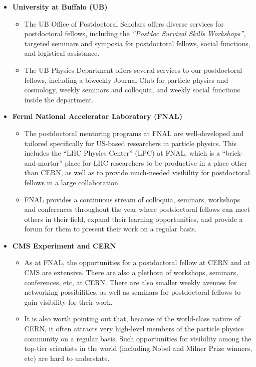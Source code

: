 \documentclass[12pt]{proposalnsf}
\begin{document}
\begin{itemize}
\item {\bf University at Buffalo (UB)}
\begin{itemize}
\item The UB Office of Postdoctoral Scholars offers diverse services
  for postdoctoral fellows, including the {\sl ``Postdoc Survival
    Skills Workshops''}, targeted seminars and symposia for
  postdoctoral fellows, social functions, and logistical assistance. 
\item The UB Physics Department offers several services to our
  postdoctoral fellows, including a biweekly Journal Club for particle
  physics and cosmology, weekly seminars and colloquia, and weekly
  social functions inside the department. 
\end{itemize}
\item {\bf Fermi National Accelerator Laboratory (FNAL)}
\begin{itemize}
\item The postdoctoral mentoring programs at FNAL are well-developed
  and tailored specifically for US-based researchers in particle
  physics. This includes the ``LHC Physics Center'' (LPC) at FNAL,
  which is a ``brick-and-mortar'' place for LHC researchers to be
  productive in a place other than CERN, as well as to provide
  much-needed visibility for postdoctoral fellows in a large
  collaboration. 
\item FNAL provides a continuous stream of colloquia, seminars,
  workshops and conferences throughout the year where postdoctoral
  fellows can meet others in their field, expand their learning
  opportunities, and provide a forum for them to present their work on
  a regular basis. 
\end{itemize}
\item {\bf CMS Experiment and CERN}
\begin{itemize}
\item As at FNAL, the opportunities for a postdoctoral fellow at CERN
  and at CMS are extensive. There are also a plethora of workshops,
  seminars, conferences, etc, at CERN. There are also smaller weekly
  avenues for networking possibilities, as well as seminars for
  postdoctoral fellows to gain visibility for their work. 
\item It is also worth pointing out that, because of the world-class
  nature of CERN, it often attracts very high-level members of the
  particle physics community on a regular basis. Such opportunities
  for visibility among the top-tier scientists in the world (including
  Nobel and Milner Prize winners, etc) are hard to understate. 
\end{itemize}
\end{itemize}
\end{document}
